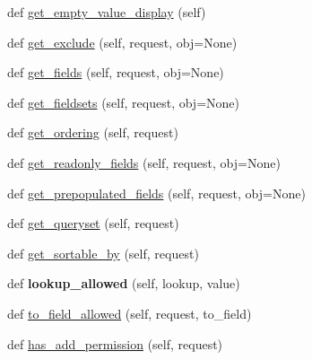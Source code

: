 \begin{DoxyCompactItemize}
\item 
def \mbox{\hyperlink{classdjango_1_1contrib_1_1admin_1_1options_1_1_base_model_admin_a2e5af6aae05e5d77af2ba74b7516b06e}{get\+\_\+empty\+\_\+value\+\_\+display}} (self)
\item 
def \mbox{\hyperlink{classdjango_1_1contrib_1_1admin_1_1options_1_1_base_model_admin_ac34d58a1679cc5408b50430f9a7f0c65}{get\+\_\+exclude}} (self, request, obj=None)
\item 
def \mbox{\hyperlink{classdjango_1_1contrib_1_1admin_1_1options_1_1_base_model_admin_a5b29108ed3553c8fcd800d6995d84b60}{get\+\_\+fields}} (self, request, obj=None)
\item 
def \mbox{\hyperlink{classdjango_1_1contrib_1_1admin_1_1options_1_1_base_model_admin_ae980d705adad22c463d965501262953b}{get\+\_\+fieldsets}} (self, request, obj=None)
\item 
def \mbox{\hyperlink{classdjango_1_1contrib_1_1admin_1_1options_1_1_base_model_admin_a3f9fee45b98ad708a112a28d526b6560}{get\+\_\+ordering}} (self, request)
\item 
def \mbox{\hyperlink{classdjango_1_1contrib_1_1admin_1_1options_1_1_base_model_admin_acb5b3d9f59396775c7a12f8336179b25}{get\+\_\+readonly\+\_\+fields}} (self, request, obj=None)
\item 
def \mbox{\hyperlink{classdjango_1_1contrib_1_1admin_1_1options_1_1_base_model_admin_a1c89d61698972c737000f557149b7dc3}{get\+\_\+prepopulated\+\_\+fields}} (self, request, obj=None)
\item 
def \mbox{\hyperlink{classdjango_1_1contrib_1_1admin_1_1options_1_1_base_model_admin_a9dc124c9d075b1782f0338dd500ec940}{get\+\_\+queryset}} (self, request)
\item 
def \mbox{\hyperlink{classdjango_1_1contrib_1_1admin_1_1options_1_1_base_model_admin_a0b4a82b7c2998cd7c3e6a18f01092273}{get\+\_\+sortable\+\_\+by}} (self, request)
\item 
\mbox{\label{classdjango_1_1contrib_1_1admin_1_1options_1_1_base_model_admin_a1d072ff853ada7a05761d37fdf6c0ca7}} 
def {\bfseries lookup\+\_\+allowed} (self, lookup, value)
\item 
def \mbox{\hyperlink{classdjango_1_1contrib_1_1admin_1_1options_1_1_base_model_admin_ae6a1e3290f8ce532ceaf8eafb4215bd3}{to\+\_\+field\+\_\+allowed}} (self, request, to\+\_\+field)
\item 
def \mbox{\hyperlink{classdjango_1_1contrib_1_1admin_1_1options_1_1_base_model_admin_a42183e7d4e76c641eb9f3fe70a1665cc}{has\+\_\+add\+\_\+permission}} (self, request)

\end{DoxyCompactItemize}
